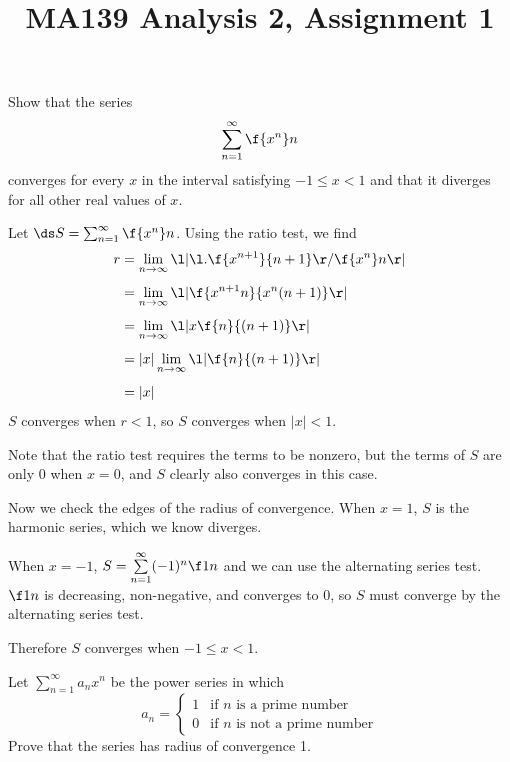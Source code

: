 \documentclass[a4paper]{article}
\title{MA139 Analysis 2, Assignment 1}
\begin{document}
\maketitle

\setlength{\parindent}{0em}
\setlength{\parskip}{1em}


\begin{questionbody}
Show that the series\[
\sum_{n=1}^\infty \f{x^n}n
\] converges for every $x$ in the interval satisfying $-1 \le x < 1$ and that it diverges for all other real values of $x$.
\end{questionbody}

Let $\ds S = \sum_{n=1}^\infty \f{x^n}n$. Using the ratio test, we find \begin{align*}
r &= \lim_{n \to \infty} \l| \l. \f{x^{n+1}}{n+1} \r/ \f{x^n}n \r|\\[1ex]
&= \lim_{n \to \infty} \l| \f{x^{n+1} n}{x^n (n+1)} \r|\\[1ex]
&= \lim_{n \to \infty} \l| x \f{n}{(n+1)} \r|\\[1ex]
&= |x| \lim_{n \to \infty} \l| \f{n}{(n+1)} \r|\\[1ex]
&= |x|
\end{align*}
$S$ converges when $r < 1$, so $S$ converges when $|x| < 1$.

Note that the ratio test requires the terms to be nonzero, but the terms of $S$ are only $0$ when $x=0$, and $S$ clearly also converges in this case.

Now we check the edges of the radius of convergence. When $x=1$, $S$ is the harmonic series, which we know diverges. %

When $x=-1$, $S = \sum\limits_{n=1}^\infty (-1)^n \f1n$ and we can use the alternating series test. $\f1n$ is decreasing, non-negative, and converges to $0$, so $S$ must converge by the alternating series test.

Therefore $S$ converges when $-1 \le x < 1$.


\begin{questionbody}
Let $\sum_{n=1}^\infty a_n x^n$ be the power series in which \[
a_n = \begin{cases}
1 & \text{if $n$ is a prime number} \\
0 & \text{if $n$ is not a prime number}
\end{cases} \] Prove that the series has radius of convergence 1.
\end{questionbody}
\end{document}
